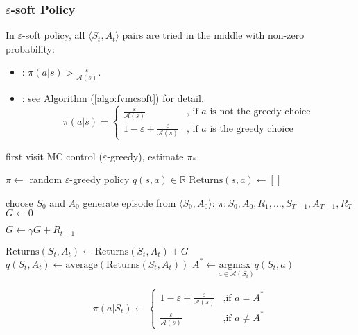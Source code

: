 \subsubsection{$\varepsilon$-soft Policy}

In $\varepsilon$-soft policy, all $\langle S_t, A_t \rangle$ pairs are tried in the middle with non-zero probability:

\begin{itemize}
	\item {} : $\pi(a|s) > \frac{\varepsilon}{\mathcal{A}(s)}$.
	\item {} : see Algorithm (\ref{algo:fvmcsoft}) for detail.
\begin{equation*}
	\pi(a|s) = 	
		\begin{cases}
				\frac{\varepsilon}{\mathcal{A}(s)} & \text{, if } a \text{ is not the greedy choice} \\
				1 - \varepsilon + \frac{\varepsilon}{\mathcal{A}(s)} & \text{, if } a  \text{ is the greedy choice}
		\end{cases}
\end{equation*}
\end{itemize}



\begin{algorithm}
	\caption{first visit MC control ($\varepsilon$-greedy), estimate $\pi_*$}\label{algo:fvmcsoft}	
	
	\begin{algorithmic}[1]
		\State $\pi \gets $ random $\varepsilon$-greedy policy
		\State $q(s,a) \in \mathbb{R}$
		\State $\text{Returns}(s,a) \gets []$
		
		\Statex
		
		\Loop
			\State choose $S_0$ and $A_0$ 
			\State generate episode from $\langle S_0,A_0 \rangle$: $\pi: S_0, A_0, R_1, \dots, S_{T-1}, A_{T-1}, R_T$
			\State $G \gets 0$
			
				\State $G \gets \gamma G + R_{t+1}$
				
					\State $\text{Returns}(S_t, A_t) \gets \text{Returns}(S_t, A_t) + G$
					\State $q(S_t, A_t) \gets \text{average}(\text{Returns}(S_t, A_t))$
					\State $A^* \gets \underset{a \in \mathcal{A}(S_t)}{\text{argmax }} q(S_t, a) $
					
					   
						\State \begin{equation*}
							\pi(a|S_t) \gets \begin{cases}
								1 - \varepsilon + \frac{\varepsilon}{\mathcal{A}(s)} & \text{,if } a = A^* \\
								\frac{\varepsilon}{\mathcal{A}(s)} & \text{,if } a \neq A^*
							\end{cases} 
						\end{equation*}
					\EndFor
				\EndIf
			\EndFor
		\EndLoop
	\end{algorithmic}
\end{algorithm}

